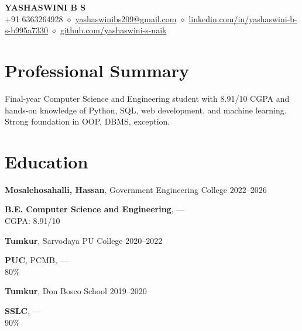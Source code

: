 \documentclass[10pt,a4paper]{article}
\begin{document}
\begin{center}
{\LARGE \textsc{\textbf{YASHASWINI B S}}} \\ \vspace{3pt}
+91 6363264928 $\diamond$ \href{mailto:yashaswinibs209@gmail.com}{yashaswinibs209@gmail.com} $\diamond$ \href{https://linkedin.com/in/yashaswini-b-s-b995a7330}{linkedin.com/in/yashaswini-b-s-b995a7330} $\diamond$ \href{https://github.com/yashaswini-s-naik}{github.com/yashaswini-s-naik}
\end{center}

\section*{Professional Summary}
Final-year Computer Science and Engineering student with 8.91/10 CGPA and hands-on knowledge of Python, SQL, web development, and machine learning. Strong foundation in OOP, DBMS, exception.

\section*{Education}
\noindent \textbf{Mosalehosahalli, Hassan}, Government Engineering College \hfill 2022–2026 \\ \vspace{4pt}

\noindent \textbf{B.E. Computer Science and Engineering}, — \\
\null \hfill CGPA: 8.91/10 \vspace{4pt}

\noindent \textbf{Tumkur}, Sarvodaya PU College \hfill 2020–2022 \\ \vspace{4pt}

\noindent \textbf{PUC}, PCMB, — \\
\null \hfill 80\% \vspace{4pt}

\noindent \textbf{Tumkur}, Don Bosco School \hfill 2019–2020 \\ \vspace{4pt}

\noindent \textbf{SSLC}, — \\
\null \hfill 90\% \vspace{4pt}


\end{document}
